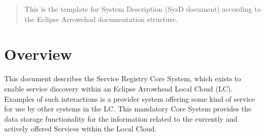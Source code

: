 \documentclass[a4paper]{arrowhead}
\begin{document}
\ArrowheadDate{\today}
\ArrowheadSetup

\begin{center}
  \vspace*{1cm}
  \huge{\arrowtitle}

  \vspace*{0.2cm}
  \LARGE{\arrowtype}
  \vspace*{1cm}

  \vspace*{\fill}


  \vspace*{1cm}
  \vspace*{\fill}

  \begin{abstract}
    This is the template for System Description (SysD document)
    according to the Eclipse Arrowehad documentation structure. 
  \end{abstract}

  \vspace*{1cm}

 \end{center}

\newpage

\tableofcontents
\newpage

\section{Overview}
\label{sec:overview}
\color{black}
This document describes the Service Registry Core System, which exists to enable service discovery within an Eclipse Arrowhead Local Cloud (LC). Examples of such interactions is a provider system offering some kind of service for use by other systems in the LC. This mandatory Core System provides the data storage functionality for the information related to the currently and actively offered Services within the Local Cloud.
\end{document}
